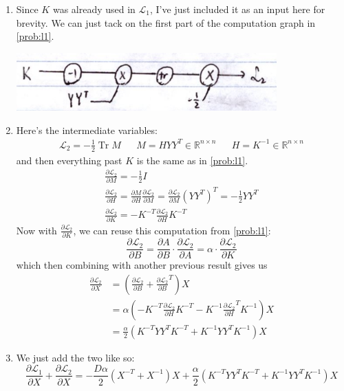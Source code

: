 \documentclass[12pt]{article}
\DeclareMathOperator{\Tr}{Tr}
\newcommand{\loss}{\mathcal{L}}
\newcommand{\real}{\mathbb{R}}
\begin{document}
\begin{enumerate}[label=(\alph*)]
    \item Since $K$ was already used in $\loss_1$, I've just included it as an input here for brevity.
          We can just tack on the first part of the computation graph in \ref{prob:l1}.
          \begin{center}
              \includegraphics[width=10cm]{img/hw3/l2}
          \end{center}

    \item Here's the intermediate variables:
          \begin{align*}
              \loss_2=-\frac{1}{2}\Tr M &  & M=HYY^T \in \real^{n \times n} &  & H=K^{-1} \in \real^{n \times n}
          \end{align*}
          and then everything past $K$ is the same as in \ref{prob:l1}.
          \begin{gather*}
              \frac{\partial \loss_2}{\partial M}=-\frac{1}{2}I \\
              \frac{\partial \loss_2}{\partial H}=\frac{\partial M}{\partial H}\frac{\partial \loss_2}{\partial M}=\frac{\partial \loss_2}{\partial M}\left(YY^T\right)^T=-\frac{1}{2}YY^T \\
              \frac{\partial \loss_2}{\partial K}=-K^{-T} \frac{\partial \loss_2}{\partial H} K^{-T}
          \end{gather*}
          Now with $\frac{\partial \loss_2}{\partial K}$, we can reuse
          this computation from \ref{prob:l1}:
          \[\frac{\partial \loss_2}{\partial B}=\frac{\partial A}{\partial B} \cdot \frac{\partial \loss_2}{\partial A}=\alpha \cdot \frac{\partial \loss_2}{\partial K}\]
          which then combining with another previous result gives us
          \begin{align*}
              \frac{\partial \loss_2}{\partial X}
               & = \left(\frac{\partial \loss_2}{\partial B}+\frac{\partial \loss_2}{\partial B}^T\right) X                                    \\
               & = \alpha \left(-K^{-T} \frac{\partial \loss_2}{\partial H}K^{-T}- K^{-1} \frac{\partial \loss_2}{\partial H}^T K^{-1}\right)X \\
               & = \boxed{\frac{\alpha}{2} \left(K^{-T}YY^TK^{-T}+K^{-1}YY^TK^{-1}\right)X }
          \end{align*}

    \item We just add the two like so:
          \[\frac{\partial \loss_1}{\partial X}+\frac{\partial \loss_2}{\partial X}=
              \boxed{-\frac{D\alpha}{2}\left(X^{-T}+X^{-1}\right)X+\frac{\alpha}{2} \left(K^{-T}YY^TK^{-T}+K^{-1}YY^TK^{-1}\right)X }\]
\end{enumerate}
\end{document}
